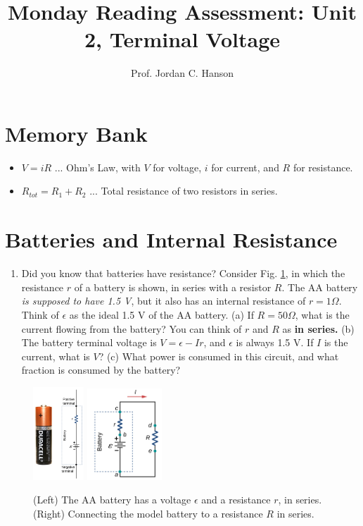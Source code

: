 \documentclass{article}
\begin{document}
\title{Monday Reading Assessment: Unit 2, Terminal Voltage}
\author{Prof. Jordan C. Hanson}

\maketitle

\section{Memory Bank}

\begin{itemize}
\item $V = i R$ ... Ohm's Law, with $V$ for voltage, $i$ for current, and $R$ for resistance.
\item $R_{tot} = R_1 + R_2$ ... Total resistance of two resistors in series.
\end{itemize}

\section{Batteries and Internal Resistance}

\begin{enumerate}
\item Did you know that batteries have resistance?  Consider Fig. \ref{fig:1}, in which the resistance $r$ of a battery is shown, in series with a resistor $R$.  The AA battery \textit{is supposed to have 1.5 V}, but it also has an internal resistance of $r = 1\Omega$.  Think of $\epsilon$ as the ideal 1.5 V of the AA battery.  (a) If $R = 50\Omega$, what is the current flowing from the battery?  You can think of $r$ and $R$ as \textbf{in series.}  (b) The battery terminal voltage is $V = \epsilon - Ir$, and $\epsilon$ is always 1.5 V.  If $I$ is the current, what is $V$? (c) What power is consumed in this circuit, and what fraction is consumed by the battery?
\end{enumerate}

\begin{figure}
\centering
\includegraphics[width=0.17\textwidth]{duracell.png} \hspace{3cm}
\includegraphics[width=0.25\textwidth]{duracell2.png}
\caption{\label{fig:1}(Left) The AA battery has a voltage $\epsilon$ and a resistance $r$, in series.  (Right) Connecting the model battery to a resistance $R$ in series.}
\end{figure}
\end{document}
